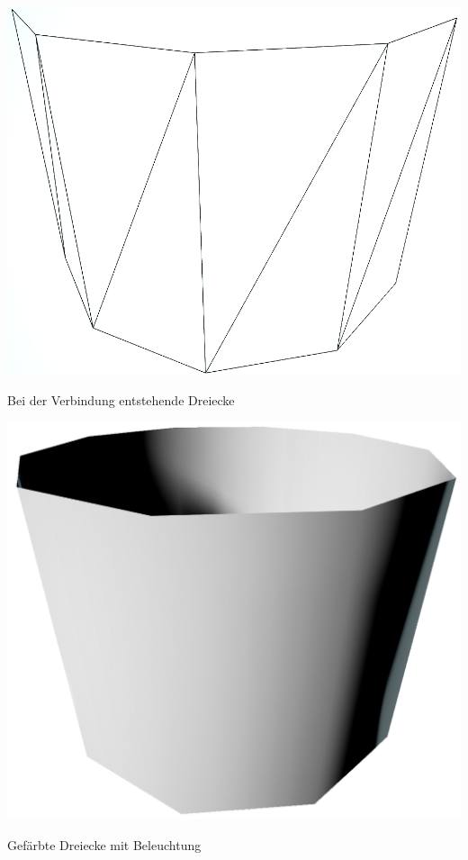 \newpage
\begin{center}
	\includegraphics[height=.9\textheight]{images/CH4_Zylinder10SegmenteWireframe.png}
	
	Bei der Verbindung entstehende Dreiecke
\end{center}




\newpage
\begin{center}
	\includegraphics[height=.9\textheight]{images/CH4_Zylinder10SegmenteOpaque.png}
	
	Gefärbte Dreiecke mit Beleuchtung
\end{center}





